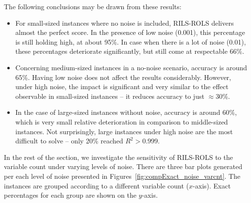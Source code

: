 \documentclass{bmcart}
\begin{document}
The following conclusions may be drawn from these results:

\begin{itemize}
	
	\item For small-sized instances where no noise is included, \textsc{RILS}-\textsc{ROLS} delivers almost the perfect score. In the presence of low noise (0.001), this percentage is still holding high, at about 95\%. In case when there is a lot of noise (0.01), these percentages deteriorate significantly, but still come at respectable 66\%. 
	
	\item Concerning medium-sized instances in a no-noise scenario, accuracy is around 65\%. Having low noise does not affect the results considerably. However, under high noise, the impact is significant and very similar to the effect observable in small-sized instances -- it reduces accuracy to just $\approx$30\%.
	
	\item In the case of large-sized instances without noise,  accuracy is around 60\%, which is very small relative deterioration in comparison to middle-sized instances. Not surprisingly, large instances under high noise are the most difficult to solve -- only 20\% reached $R^2 > 0.999$. 
	
\end{itemize}

In the rest of the section, we investigate the sensitivity of \textsc{RILS}-\textsc{ROLS} to the variable count under varying levels of noise. There are three bar plots generated per each level of noise presented in Figures~\ref{fig:compExact_noise_varcnt}. The instances are grouped according to a different variable count ($x$-axis). Exact percentages for each group are shown on the $y$-axis.
\end{document}
